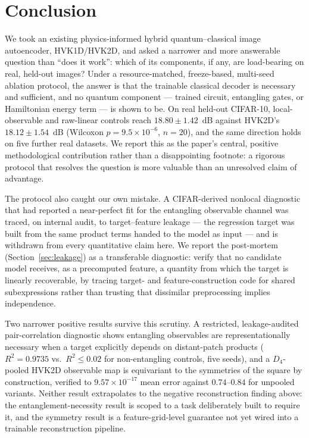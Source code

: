 \documentclass[journal]{IEEEtran}
\begin{document}
\section{Conclusion}
We took an existing physics-informed hybrid quantum--classical image autoencoder, HVK1D/HVK2D, and asked a narrower and more answerable question than ``does it work'': which of its components, if any, are load-bearing on real, held-out images? Under a resource-matched, freeze-based, multi-seed ablation protocol, the answer is that the trainable classical decoder is necessary and sufficient, and no quantum component --- trained circuit, entangling gates, or Hamiltonian energy term --- is shown to be. On real held-out CIFAR-10, local-observable and raw-linear controls reach $18.80\pm1.42$~dB against HVK2D's $18.12\pm1.54$~dB (Wilcoxon $p=9.5\times10^{-6}$, $n=20$), and the same direction holds on five further real datasets. We report this as the paper's central, positive methodological contribution rather than a disappointing footnote: a rigorous protocol that resolves the question is more valuable than an unresolved claim of advantage.

The protocol also caught our own mistake. A CIFAR-derived nonlocal diagnostic that had reported a near-perfect fit for the entangling observable channel was traced, on internal audit, to target--feature leakage --- the regression target was built from the same product terms handed to the model as input --- and is withdrawn from every quantitative claim here. We report the post-mortem (Section~\ref{sec:leakage}) as a transferable diagnostic: verify that no candidate model receives, as a precomputed feature, a quantity from which the target is linearly recoverable, by tracing target- and feature-construction code for shared subexpressions rather than trusting that dissimilar preprocessing implies independence.

Two narrower positive results survive this scrutiny. A restricted, leakage-audited pair-correlation diagnostic shows entangling observables are representationally necessary when a target explicitly depends on distant-patch products ($R^2=0.9735$ vs.\ $R^2\leq0.02$ for non-entangling controls, five seeds), and a $D_4$-pooled HVK2D observable map is equivariant to the symmetries of the square by construction, verified to $9.57\times10^{-17}$ mean error against $0.74$--$0.84$ for unpooled variants. Neither result extrapolates to the negative reconstruction finding above: the entanglement-necessity result is scoped to a task deliberately built to require it, and the symmetry result is a feature-grid-level guarantee not yet wired into a trainable reconstruction pipeline.
\end{document}
